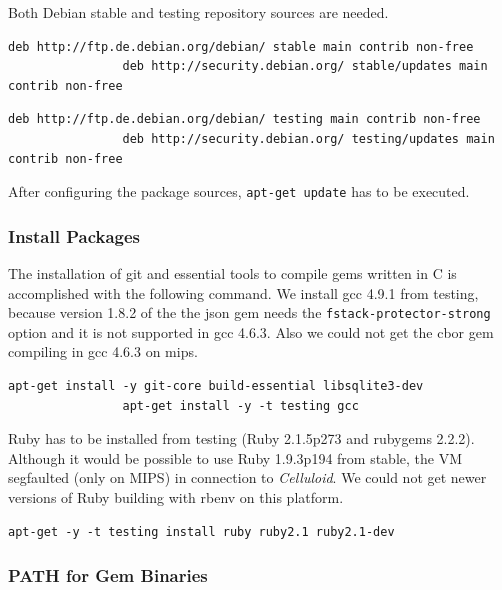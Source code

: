 			Both Debian stable and testing repository sources are needed.

			\begin{lstlisting}[gobble=8,caption={/etc/apt/sources.list.d/stable.list}]
				deb http://ftp.de.debian.org/debian/ stable main contrib non-free
				deb http://security.debian.org/ stable/updates main contrib non-free
			\end{lstlisting}

			\begin{lstlisting}[gobble=8,caption={/etc/apt/sources.list.d/testing.list}]
				deb http://ftp.de.debian.org/debian/ testing main contrib non-free
				deb http://security.debian.org/ testing/updates main contrib non-free
			\end{lstlisting}

			After configuring the package sources, \texttt{apt-get update} has
			to be executed.

		\subsubsection{Install Packages}

			The installation of git and essential tools to compile gems written
			in C is accomplished with the following command. We install gcc
			4.9.1 from testing, because version 1.8.2 of the the json gem needs
			the \texttt{fstack-protector-strong} option and it is not supported
			in gcc 4.6.3. Also we could not get the cbor gem compiling in gcc
			4.6.3 on mips.

			\begin{lstlisting}[gobble=8]
				apt-get install -y git-core build-essential libsqlite3-dev
				apt-get install -y -t testing gcc
			\end{lstlisting}

			Ruby has to be installed from testing (Ruby 2.1.5p273 and rubygems
			2.2.2). Although it would be possible to use Ruby 1.9.3p194 from
			stable, the \ac{VM} segfaulted (only on MIPS) in connection to
			\emph{Celluloid}. We could not get newer versions of Ruby building
			with rbenv on this platform.

			\begin{lstlisting}[gobble=8]
				apt-get -y -t testing install ruby ruby2.1 ruby2.1-dev
			\end{lstlisting}

		\subsubsection{PATH for Gem Binaries}


